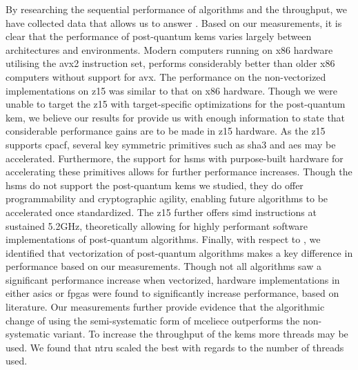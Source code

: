 
By researching the sequential performance of algorithms and the throughput, we have collected data that allows us to answer . Based on our measurements, it is clear that the performance of \gls{post-quantum} \glspl{kem} varies largely between architectures and environments. Modern computers running on \gls{x86} hardware utilising the \gls{avx2} instruction set, performs considerably better than older \gls{x86} computers without support for \gls{avx}. The performance on the non-vectorized implementations on \gls{z15} was similar to that on \gls{x86} hardware. Though we were unable to target the \gls{z15} with target-specific optimizations for the \gls{post-quantum} \gls{kem}, we believe our results for  provide us with enough information to state that considerable performance gains are to be made in \gls{z15} hardware. As the \gls{z15} supports \gls{cpacf}, several key symmetric primitives such as \gls{sha3} and \gls{aes} may be accelerated. Furthermore, the support for \glspl{hsm} with purpose-built hardware for accelerating these primitives allows for further performance increases. Though the \glspl{hsm} do not support the \gls{post-quantum} \glspl{kem} we studied, they do offer programmability and cryptographic agility, enabling future algorithms to be accelerated once standardized. The \gls{z15} further offers \gls{simd} instructions at sustained 5.2GHz, theoretically allowing for highly performant software implementations of \gls{post-quantum} algorithms. Finally, with respect to , we identified that vectorization of \gls{post-quantum} algorithms makes a key difference in performance based on our measurements. Though not all algorithms saw a significant performance increase when vectorized, hardware implementations in either \glspl{asic} or \glspl{fpga} were found to significantly increase performance, based on literature. Our measurements further provide evidence that the algorithmic change of using the semi-systematic form of \gls{mceliece} outperforms the non-systematic variant. To increase the throughput of the \glspl{kem} more threads may be used. We found that \gls{ntru} scaled the best with regards to the number of threads used.

